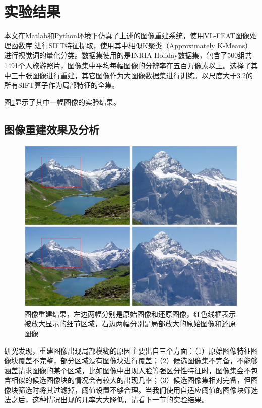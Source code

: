 \section{实验结果}
本文在Matlab和Python环境下仿真了上述的图像重建系统，使用VL-FEAT图像处理函数库
\cite{vl_feat}进行SIFT特征提取，使用其中相似K聚类（Approximately K-Means）进行视觉词的量化分类。数据集使用的是INRIA Holiday数据集\cite{INRIA}，包含了500组共1491个人旅游照片，图像集中平均每幅图像的分辨率在五百万像素以上。选择了其中三十张图像进行重建，其它图像作为大图像数据集进行训练。以尺度大于3.2的所有SIFT算子作为局部特征的全集。

图\ref{fig:detail_result}显示了其中一幅图像的实验结果。
\subsection{图像重建效果及分析}
\begin{figure}
\centering\includegraphics[width=15cm]{imgs/ch4/detail_result}
\caption{图像重建结果，左边两幅分别是原始图像和还原图像，红色线框表示被放大显示的细节区域，右边两幅分别是局部放大的原始图像和还原图像}
\label{fig:detail_result}
\end{figure}

研究发现，重建图像出现局部模糊的原因主要出自三个方面：（1）原始图像特征图像块覆盖不完整，部分区域没有图像块进行覆盖；（2）候选图像集不完备，不能够涵盖请求图像的某个区域，比如图像中出现人脸等强区分性特征时，图像集会不包含相似的候选图像块的情况会有较大的出现几率；（3）候选图像集相对完备，但图像块筛选时将其过滤掉，阈值设置不够合理。当我们使用自适应阈值的图像块筛选法之后，这种情况出现的几率大大降低，请看下一节的实验结果。

